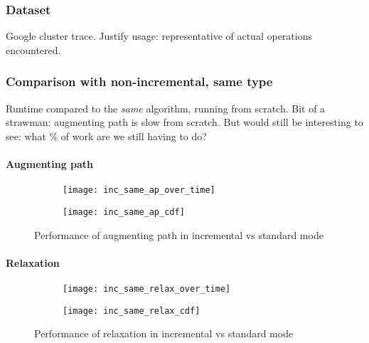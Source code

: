 \subsubsection{Dataset}

Google cluster trace. Justify usage: representative of actual operations encountered.

\subsubsection{Comparison with non-incremental, same type}

Runtime compared to the {\it same} algorithm, running from scratch. Bit of a strawman: augmenting path is slow from scratch. But would still be interesting to see: what \% of work are we still having to do?

\paragraph{Augmenting path}

\begin{figure}
    \centering
    \begin{subfigure}[c]{0.45\textwidth}
        \texttt{[image: inc\_same\_ap\_over\_time]}
    \end{subfigure}
    \begin{subfigure}[c]{0.45\textwidth}
        \texttt{[image: inc\_same\_ap\_cdf]}
    \end{subfigure}
    \caption{Performance of augmenting path in incremental vs standard mode}
    \label{fig:inc-same-ap}
\end{figure}

\paragraph{Relaxation}

\begin{figure}
    \centering
    \begin{subfigure}[c]{0.45\textwidth}
        \texttt{[image: inc\_same\_relax\_over\_time]}
    \end{subfigure}
    \begin{subfigure}[c]{0.45\textwidth}
        \texttt{[image: inc\_same\_relax\_cdf]}
    \end{subfigure}
    \caption{Performance of relaxation in incremental vs standard mode}
    \label{fig:inc-same-relax}
\end{figure}

